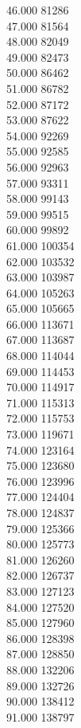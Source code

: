 { 46.000	81286 \\
 47.000	81564 \\
 48.000	82049 \\
 49.000	82473 \\
 50.000	86462 \\
 51.000	86782 \\
 52.000	87172 \\
 53.000	87622 \\
 54.000	92269 \\
 55.000	92585 \\
 56.000	92963 \\
 57.000	93311 \\
 58.000	99143 \\
 59.000	99515 \\
 60.000	99892 \\
 61.000	100354 \\
 62.000	103532 \\
 63.000	103987 \\
 64.000	105263 \\
 65.000	105665 \\
 66.000	113671 \\
 67.000	113687 \\
 68.000	114044 \\
 69.000	114453 \\
 70.000	114917 \\
 71.000	115313 \\
 72.000	115753 \\
 73.000	119671 \\
 74.000	123164 \\
 75.000	123680 \\
 76.000	123996 \\
 77.000	124404 \\
 78.000	124837 \\
 79.000	125366 \\
 80.000	125773 \\
 81.000	126260 \\
 82.000	126737 \\
 83.000	127123 \\
 84.000	127520 \\
 85.000	127960 \\
 86.000	128398 \\
 87.000	128850 \\
 88.000	132206 \\
 89.000	132726 \\
 90.000	138412 \\
 91.000	138797 \\
}
